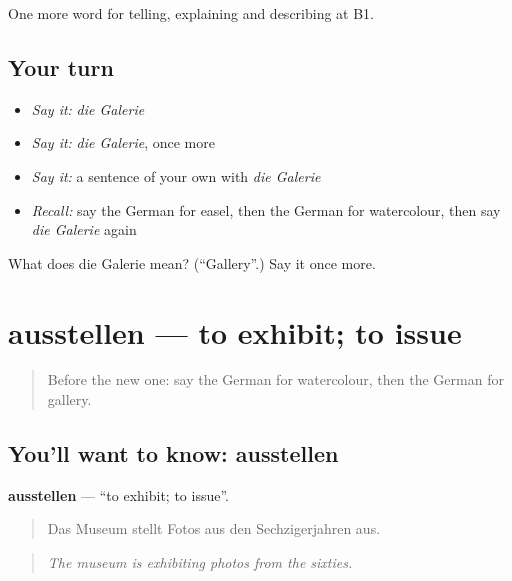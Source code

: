 \begin{grammarlens}[title={What you've built}]
One more word for telling, explaining and describing at B1.
\end{grammarlens}

\subsection*{Your turn}
\begin{itemize}
\raggedright
  \item \emph{Say it:} \emph{die Galerie}
  \item \emph{Say it:} \emph{die Galerie}, once more
  \item \emph{Say it:} a sentence of your own with \emph{die Galerie}
  \item \emph{Recall:} say the German for easel, then the German for watercolour, then say \emph{die Galerie} again
\end{itemize}

\begin{tcolorbox}[breakable,colback=teal!4,colframe=teal!35!black,title={Before you move on}]
What does die Galerie mean? (\textquotedblleft{}Gallery\textquotedblright{}.) Say it once more.
\end{tcolorbox}
\section[ausstellen]{ausstellen — to exhibit; to issue}

\label{lesson:GE-C519-ausstellen}



\begin{quote}
Before the new one: say the German for watercolour, then the German for gallery.
\end{quote}

\subsection*{You'll want to know: ausstellen}
\textbf{ausstellen} — \textquotedblleft{}to exhibit; to issue\textquotedblright{}.

\begin{quote}
Das Museum stellt Fotos aus den Sechzigerjahren aus.
\end{quote}

\begin{quote}
\emph{The museum is exhibiting photos from the sixties.}
\end{quote}

